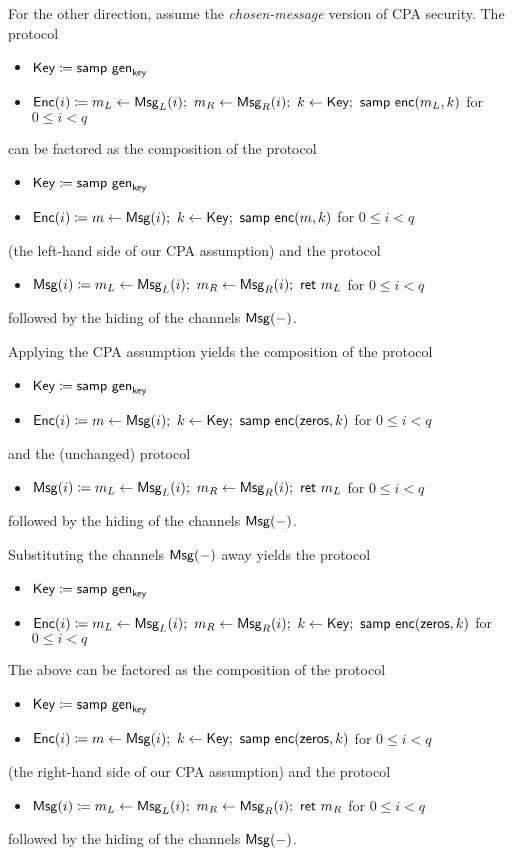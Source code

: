 For the other direction, assume the \emph{chosen-message} version of CPA security. The protocol
\begin{itemize}
\item $\mathsf{Key} \coloneqq \mathsf{samp} \ \mathsf{gen}_{\mathsf{key}}$
\item $\Enc(i) \coloneqq m_L \leftarrow \MsgL(i); \ m_R \leftarrow \MsgR(i); \ k \leftarrow \Key; \ \samp{\enc(m_L,k)}$ for $0 \leq i < q$
\end{itemize}
can be factored as the composition of the protocol
\begin{itemize}
\item $\mathsf{Key} \coloneqq \mathsf{samp} \ \mathsf{gen}_{\mathsf{key}}$
\item $\mathsf{Enc}(i) \coloneqq m \leftarrow \mathsf{Msg}(i); \ k \leftarrow \mathsf{Key}; \ \mathsf{samp} \ \mathsf{enc}(m,k)$ for $0 \leq i < q$
\end{itemize}
(the left-hand side of our CPA assumption) and the protocol
\begin{itemize}
\item $\mathsf{Msg}(i) \coloneqq m_L \leftarrow \mathsf{Msg}_L(i); \ m_R \leftarrow \mathsf{Msg}_R(i); \ \mathsf{ret} \ m_L$ for $0 \leq i < q$
\end{itemize}
followed by the hiding of the channels $\mathsf{Msg}(-)$.

Applying the CPA assumption yields the composition of the protocol
\begin{itemize}
\item $\mathsf{Key} \coloneqq \mathsf{samp} \ \mathsf{gen}_{\mathsf{key}}$
\item $\mathsf{Enc}(i) \coloneqq m \leftarrow \mathsf{Msg}(i); \ k \leftarrow \mathsf{Key}; \ \mathsf{samp} \ \mathsf{enc}(\mathsf{zeros},k)$ for $0 \leq i < q$
\end{itemize}
and the (unchanged) protocol
\begin{itemize}
\item $\mathsf{Msg}(i) \coloneqq m_L \leftarrow \mathsf{Msg}_L(i); \ m_R \leftarrow \mathsf{Msg}_R(i); \ \mathsf{ret} \ m_L$ for $0 \leq i < q$
\end{itemize}
followed by the hiding of the channels $\mathsf{Msg}(-)$.

Substituting the channels $\mathsf{Msg}(-)$ away yields the protocol
\begin{itemize}
\item $\mathsf{Key} \coloneqq \mathsf{samp} \ \mathsf{gen}_{\mathsf{key}}$
\item $\Enc(i) \coloneqq m_L \leftarrow \MsgL(i); \ m_R \leftarrow \MsgR(i); \ k \leftarrow \Key; \ \samp{\enc(\zeros,k)}$ for $0 \leq i < q$
\end{itemize}

The above can be factored as the composition of the protocol
\begin{itemize}
\item $\mathsf{Key} \coloneqq \mathsf{samp} \ \mathsf{gen}_{\mathsf{key}}$
\item $\mathsf{Enc}(i) \coloneqq m \leftarrow \mathsf{Msg}(i); \ k \leftarrow \mathsf{Key}; \ \mathsf{samp} \ \mathsf{enc}(\mathsf{zeros}, k)$ for $0 \leq i < q$
\end{itemize}
(the right-hand side of our CPA assumption) and the protocol
\begin{itemize}
\item $\mathsf{Msg}(i) \coloneqq m_L \leftarrow \mathsf{Msg}_L(i); \ m_R \leftarrow \mathsf{Msg}_R(i); \ \mathsf{ret} \ m_R$ for $0 \leq i < q$
\end{itemize}
followed by the hiding of the channels $\mathsf{Msg}(-)$.

